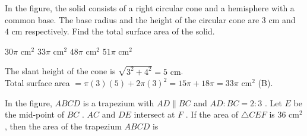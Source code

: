 \question In the figure, the solid consists of a right circular cone and a hemisphere with a common base. The base radius and the height of the circular cone are $3\text{ cm}$ and $4\text{ cm}$ respectively. Find the total surface area of the solid.

\begin{minipage}{0.45\textwidth}
\begin{choices}
    \choice $30\pi\text{ cm}^2$
    \correctchoice $33\pi\text{ cm}^2$
    \choice $48\pi\text{ cm}^2$
    \choice $51\pi\text{ cm}^2$
\end{choices}
\end{minipage}
\begin{minipage}{0.52\textwidth}
\centering
{}
\end{minipage}
\begin{solution}
The slant height of the cone is $\sqrt{3^2 + 4^2} = 5\text{ cm}$. \\
Total surface area $= \pi(3)(5) + 2\pi(3)^2 = 15\pi + 18\pi = 33\pi\text{ cm}^2$ (B).
\end{solution}

\question In the figure, $ABCD$ is a trapezium with $AD \parallel BC$ and $AD : BC = 2 : 3$ . Let $E$ be the mid-point of $BC$ . $AC$ and $DE$ intersect at $F$ . If the area of $\triangle CEF$ is $36\text{ cm}^2$ , then the area of the trapezium $ABCD$ is


